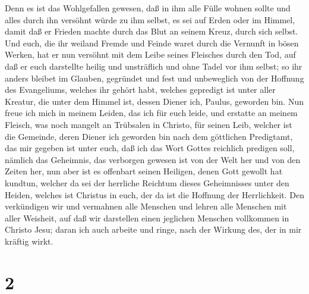  Denn es ist das Wohlgefallen gewesen, daß in ihm alle
Fülle wohnen sollte  und alles durch ihn versöhnt würde zu
ihm selbst, es sei auf Erden oder im Himmel, damit daß er Frieden machte
durch das Blut an seinem Kreuz, durch sich selbst.  Und
euch, die ihr weiland Fremde und Feinde waret durch die Vernunft in
bösen Werken,  hat er nun versöhnt mit dem Leibe seines
Fleisches durch den Tod, auf daß er euch darstellte heilig und
unsträflich und ohne Tadel vor ihm selbst;  so ihr anders
bleibet im Glauben, gegründet und fest und unbeweglich von der Hoffnung
des Evangeliums, welches ihr gehört habt, welches gepredigt ist unter
aller Kreatur, die unter dem Himmel ist, dessen Diener ich, Paulus,
geworden bin.  Nun freue ich mich in meinem Leiden, das ich
für euch leide, und erstatte an meinem Fleisch, was noch mangelt an
Trübsalen in Christo, für seinen Leib, welcher ist die Gemeinde,
 deren Diener ich geworden bin nach dem göttlichen
Predigtamt, das mir gegeben ist unter euch, daß ich das Wort Gottes
reichlich predigen soll,  nämlich das Geheimnis, das
verborgen gewesen ist von der Welt her und von den Zeiten her, nun aber
ist es offenbart seinen Heiligen,  denen Gott gewollt hat
kundtun, welcher da sei der herrliche Reichtum dieses Geheimnisses unter
den Heiden, welches ist Christus in euch, der da ist die Hoffnung der
Herrlichkeit.  Den verkündigen wir und vermahnen alle
Menschen und lehren alle Menschen mit aller Weisheit, auf daß wir
darstellen einen jeglichen Menschen vollkommen in Christo Jesu;
 daran ich auch arbeite und ringe, nach der Wirkung des,
der in mir kräftig wirkt.

\hypertarget{section-1}{%
\section{2}\label{section-1}}

